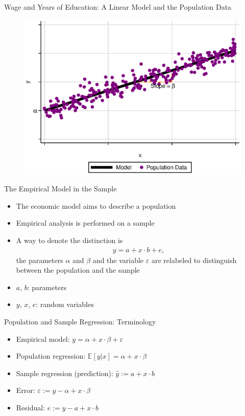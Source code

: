 \documentclass[static]{JJH-Beamer}
\begin{document}
\begin{frame}[noframenumbering]{Wage and Years of Education: A Linear Model and the Population Data}
\begin{figure}[H]
\centering
\includegraphics[width=.85\columnwidth]{linear_empirical}
\end{figure}
\end{frame} 

\begin{frame}{The Empirical Model in the Sample}
	\begin{itemize}
		\item The economic model aims to describe a population
		\bigskip
		\item Empirical analysis is performed on a sample
		\item A way to denote the distinction is
			\begin{align}
				y = a + x \cdot b + e, \nonumber
			\end{align}
	\noindent the parameters $\alpha$ and $\beta$ and the variable $\varepsilon$ are relabeled to distinguish between the population and the sample
	\bigskip
		\item $a$, $b$: parameters
		\item $y$, $x$, $e$: random variables
	\end{itemize}
\end{frame}

\begin{frame}{Population and Sample Regression: Terminology}
	\begin{itemize}
		\item Empirical model: $y = \alpha + x \cdot \beta + \varepsilon$
		\bigskip
		\item Population regression: $\mathbb{E} \left[ y | x \right]  = \alpha + x \cdot \beta$
		\item Sample regression (prediction): $\hat{y} := a + x \cdot b$
		\bigskip
		\item Error: $\varepsilon:= y - \alpha + x \cdot \beta$
		\item Residual: $e:= y - a + x \cdot b$
	\end{itemize}
\end{frame}
\end{document}
